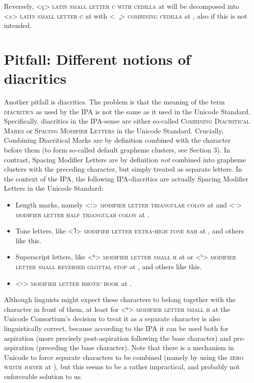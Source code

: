 Reversely, <ç> \textsc{latin small letter c with cedilla} at  will be
decomposed into <c> \textsc{latin small letter c} at  with 
<\ \ {\large  ̧}> \textsc{combining cedilla} at , 
also if this is not intended.

\section{Pitfall: Different notions of diacritics}
\label{pitfall-the-ipa-notion-of-diacritics-is-not-the-same-as-the-unicode-standards-notion-of-diacritics}

Another pitfall is diacritics. The problem is that the meaning of the term
\textsc{diacritics} as used by the IPA is not the same as it used in the Unicode
Standard. Specifically, diacritics in the IPA-sense are either so-called
\textsc{Combining Diacritical Marks} or \textsc{Spacing Modifier Letters} in the
Unicode Standard. Crucially, Combining Diacritical Marks are by definition
combined with the character before them (to form so-called default grapheme
clusters, see Section 3). In contrast, Spacing Modifier Letters are by
definition \emph{not} combined into grapheme clusters with the preceding
character, but simply treated as separate letters. In the context of the IPA,
the following IPA-diacritics are actually Spacing Modifier Letters in the
Unicode Standard:

\begin{itemize}
	\item Length marks, namely <ː> \textsc{modifier letter triangular colon} at  and <ˑ> \textsc{modifier letter half triangular colon} at . 
	\item Tone letters, like <˥> \textsc{modifier letter extra-high tone bar} at , and others like this. 
	\item Superscript letters, like <ʰ> \textsc{modifier letter small h} at  or <ˤ> \textsc{modifier letter small reversed glottal stop} at , and others like this. 
	\item <˞> \textsc{modifier letter rhotic hook} at . 
\end{itemize}

Although linguists might expect these characters to belong together with the
character in front of them, at least for <ʰ> \textsc{modifier letter small h} at
 the Unicode Consortium's decision to treat it as a separate character
is also linguistically correct, because according to the IPA it can be used both
for aspiration (more precisely post-aspiration following the base character) and
pre-aspiration (preceding the base character). Note that there is a mechanism in
Unicode to force separate characters to be combined (namely by using the
\textsc{zero width joiner} at ), but this seems to be a rather
impractical, and probably not enforceable solution to us.

